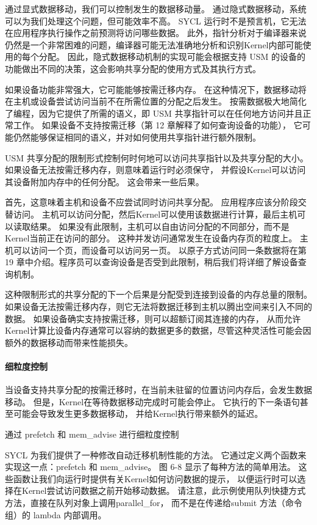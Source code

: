 通过显式数据移动，我们可以控制发生的数据移动量。 通过隐式数据移动，系统可以为我们处理这个问题，但可能效率不高。 
SYCL 运行时不是预言机，它无法在应用程序执行操作之前预测将访问哪些数据。 
此外，指针分析对于编译器来说仍然是一个非常困难的问题，编译器可能无法准确地分析和识别Kernel内部可能使用的每个分配。 
因此，隐式数据移动机制的实现可能会根据支持 USM 的设备的功能做出不同的决策，这会影响共享分配的使用方式及其执行方式。

如果设备功能非常强大，它可能能够按需迁移内存。 
在这种情况下，数据移动将在主机或设备尝试访问当前不在所需位置的分配之后发生。 
按需数据极大地简化了编程，因为它提供了所需的语义，即 USM 共享指针可以在任何地方访问并且正常工作。 
如果设备不支持按需迁移（第 12 章解释了如何查询设备的功能），
它可能仍然能够保证相同的语义，并对如何使用共享指针进行额外限制。

USM 共享分配的限制形式控制何时何地可以访问共享指针以及共享分配的大小。 
如果设备无法按需迁移内存，则意味着运行时必须保守，
并假设Kernel可以访问其设备附加内存中的任何分配。 这会带来一些后果。

首先，这意味着主机和设备不应尝试同时访问共享分配。 应用程序应该分阶段交替访问。 
主机可以访问分配，然后Kernel可以使用该数据进行计算，最后主机可以读取结果。 
如果没有此限制，主机可以自由访问分配的不同部分，而不是Kernel当前正在访问的部分。 
这种并发访问通常发生在设备内存页的粒度上。 主机可以访问一个页，而设备可以访问另一页。 
以原子方式访问同一条数据将在第 19 章中介绍。程序员可以查询设备是否受到此限制，稍后我们将详细了解设备查询机制。

这种限制形式的共享分配的下一个后果是分配受到连接到设备的内存总量的限制。 
如果设备无法按需迁移内存，则它无法将数据迁移到主机以腾出空间来引入不同的数据。 
如果设备确实支持按需迁移，则可以超额订阅其连接的内存，
从而允许Kernel计算比设备内存通常可以容纳的数据更多的数据，尽管这种灵活性可能会因额外的数据移动而带来性能损失。

\paragraph{细粒度控制}

当设备支持共享分配的按需迁移时，在当前未驻留的位置访问内存后，会发生数据移动。 
但是，Kernel在等待数据移动完成时可能会停止。 它执行的下一条语句甚至可能会导致发生更多数据移动，
并给Kernel执行带来额外的延迟。

{\color{red} 通过 prefetch 和 mem\_advise 进行细粒度控制}

SYCL 为我们提供了一种修改自动迁移机制性能的方法。 它通过定义两个函数来实现这一点：prefetch 和 mem\_advise。 
图 6-8 显示了每种方法的简单用法。 这些函数让我们向运行时提供有关Kernel如何访问数据的提示，
以便运行时可以选择在Kernel尝试访问数据之前开始移动数据。 
请注意，此示例使用队列快捷方式方法，直接在队列对象上调用parallel\_for，
而不是在传递给submit 方法（命令组）的 lambda 内部调用。

